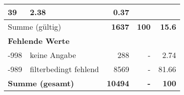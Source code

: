 \begin{longtable}{lXrrr}
       \num{39} &
       \num[round-mode=places,round-precision=2]{2.38} &
         \num[round-mode=places,round-precision=2]{0.37} \\
     \midrule
     \multicolumn{2}{l}{Summe (gültig)} &
       \textbf{\num{1637}} &
     \textbf{\num{100}} &
       \textbf{\num[round-mode=places,round-precision=2]{15.6}} \\
     \multicolumn{5}{l}{\textbf{Fehlende Werte}}\\
       -998 &
       keine Angabe &
         \num{288} &
        - &
         \num[round-mode=places,round-precision=2]{2.74} \\
       -989 &
       filterbedingt fehlend &
         \num{8569} &
        - &
         \num[round-mode=places,round-precision=2]{81.66} \\
     \midrule
     \multicolumn{2}{l}{\textbf{Summe (gesamt)}} &
          \textbf{\num{10494}} &
        \textbf{-} &
        \textbf{\num{100}} \\
     \bottomrule
     \end{longtable}
     
